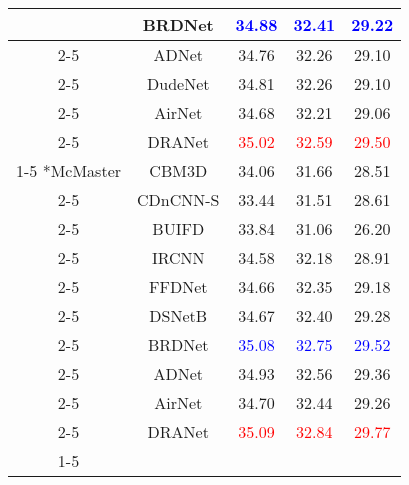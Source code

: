 \documentclass[3p,times]{elsarticle}
\begin{document}
\begin{table*}[htbp]
\begin{tabular}{ccccc}
    & BRDNet \cite{Tian2020} & \textcolor{blue}{34.88} & \textcolor{blue}{32.41} & \textcolor{blue}{29.22} \\
\cline{2-5}
    & ADNet \cite{TianX2020} & 34.76 & 32.26 & 29.10 \\
\cline{2-5}
    & DudeNet \cite{Tian2021} & 34.81 & 32.26 & 29.10 \\
\cline{2-5}
    & AirNet \cite{Li2022} & 34.68 & 32.21 & 29.06\\
\cline{2-5}
    & DRANet & \textcolor{red}{35.02} & \textcolor{red}{32.59} & \textcolor{red}{29.50} \\
\cline{1-5}
\multirow{11}*{McMaster} & CBM3D \cite{Dabov2007} & 34.06 & 31.66 & 28.51 \\
\cline{2-5}
    & CDnCNN-S \cite{Zhang2017} & 33.44 & 31.51 & 28.61\\
\cline{2-5}
    & BUIFD \cite{Helou2020} & 33.84 & 31.06 & 26.20\\
\cline{2-5}
    & IRCNN \cite{ZhangZGZ2017} & 34.58 & 32.18 & 28.91\\
\cline{2-5}
    & FFDNet \cite{Zhang2018} & 34.66 & 32.35 & 29.18\\
\cline{2-5}
    & DSNetB \cite{Peng2019} & 34.67 & 32.40 & 29.28\\
\cline{2-5}
    & BRDNet \cite{Tian2020} & \textcolor{blue}{35.08} & \textcolor{blue}{32.75} & \textcolor{blue}{29.52} \\
\cline{2-5}
    & ADNet \cite{TianX2020} & 34.93 & 32.56  & 29.36 \\
\cline{2-5}
    & AirNet \cite{Li2022} & 34.70 & 32.44 & 29.26 \\
\cline{2-5}
    & DRANet & \textcolor{red}{35.09} & \textcolor{red}{32.84} & \textcolor{red}{29.77} \\
\cline{1-5}
\end{tabular}
\end{table*}
\end{document}

